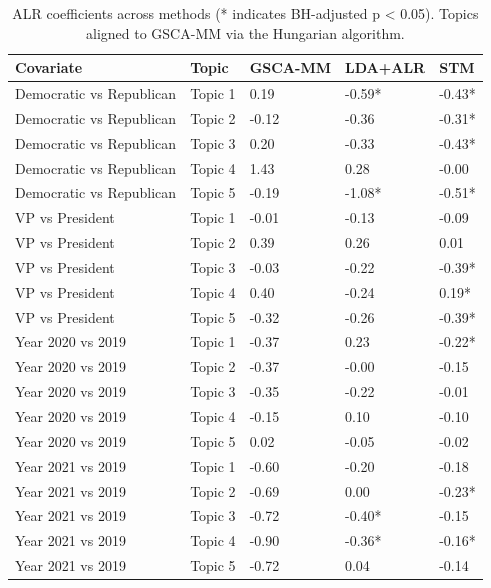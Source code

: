 \begin{table}[ht]
\centering
\begin{tabular}{lllll}
  \toprule
Covariate & Topic & GSCA-MM & LDA+ALR & STM \\ 
  \midrule
Democratic vs Republican & Topic 1 &  0.19  & -0.59* & -0.43* \\ 
  Democratic vs Republican & Topic 2 & -0.12  & -0.36  & -0.31* \\ 
  Democratic vs Republican & Topic 3 &  0.20  & -0.33  & -0.43* \\ 
  Democratic vs Republican & Topic 4 &  1.43  &  0.28  & -0.00  \\ 
  Democratic vs Republican & Topic 5 & -0.19  & -1.08* & -0.51* \\ 
  VP vs President & Topic 1 & -0.01  & -0.13  & -0.09  \\ 
  VP vs President & Topic 2 &  0.39  &  0.26  &  0.01  \\ 
  VP vs President & Topic 3 & -0.03  & -0.22  & -0.39* \\ 
  VP vs President & Topic 4 &  0.40  & -0.24  &  0.19* \\ 
  VP vs President & Topic 5 & -0.32  & -0.26  & -0.39* \\ 
  Year 2020 vs 2019 & Topic 1 & -0.37  &  0.23  & -0.22* \\ 
  Year 2020 vs 2019 & Topic 2 & -0.37  & -0.00  & -0.15  \\ 
  Year 2020 vs 2019 & Topic 3 & -0.35  & -0.22  & -0.01  \\ 
  Year 2020 vs 2019 & Topic 4 & -0.15  &  0.10  & -0.10  \\ 
  Year 2020 vs 2019 & Topic 5 &  0.02  & -0.05  & -0.02  \\ 
  Year 2021 vs 2019 & Topic 1 & -0.60  & -0.20  & -0.18  \\ 
  Year 2021 vs 2019 & Topic 2 & -0.69  &  0.00  & -0.23* \\ 
  Year 2021 vs 2019 & Topic 3 & -0.72  & -0.40* & -0.15  \\ 
  Year 2021 vs 2019 & Topic 4 & -0.90  & -0.36* & -0.16* \\ 
  Year 2021 vs 2019 & Topic 5 & -0.72  &  0.04  & -0.14  \\ 
   \bottomrule
\end{tabular}
\caption{ALR coefficients across methods (* indicates BH-adjusted p < 0.05). Topics aligned to GSCA-MM via the Hungarian algorithm.} 
\label{tab:robustness}
\end{table}
